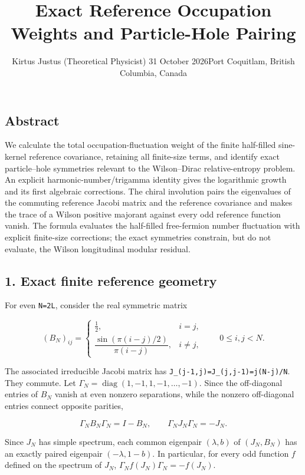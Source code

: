 \documentclass[
  10pt,
  a4paper,
]{article}
\title{Exact Reference Occupation Weights and Particle-Hole Pairing}
\author{Kirtus Justus (Theoretical Physicist) \textbullet{} 31 October 2026\tabularnewline Port Coquitlam, British Columbia, Canada}
\date{}
\begin{document}
\maketitle

\subsection{Abstract}\label{abstract}

We calculate the total occupation-fluctuation weight of the finite half-filled sine-kernel reference covariance, retaining all finite-size terms, and identify exact particle--hole symmetries relevant to the Wilson--Dirac relative-entropy problem. An explicit harmonic-number/trigamma identity gives the logarithmic growth and its first algebraic corrections. The chiral involution pairs the eigenvalues of the commuting reference Jacobi matrix and the reference covariance and makes the trace of a Wilson positive majorant against every odd reference function vanish. The formula evaluates the half-filled free-fermion number fluctuation with explicit finite-size corrections; the exact symmetries constrain, but do not evaluate, the Wilson longitudinal modular residual.

\subsection{1. Exact finite reference geometry}\label{exact-finite-reference-geometry}

For even \texttt{N=2L}, consider the real symmetric matrix

\[
(B_N)_{ij}=\begin{cases}\tfrac12,&i=j,\\
\dfrac{\sin(\pi(i-j)/2)}{\pi(i-j)},&i\ne j,
\end{cases}\qquad 0\le i,j<N.
\]

The associated irreducible Jacobi matrix has \texttt{J\_(j-1,j)=J\_(j,j-1)=j(N-j)/N}. They commute. Let \(\Gamma_N=\operatorname{diag}(1,-1,1,-1,\ldots,-1)\). Since the off-diagonal entries of \(B_N\) vanish at even nonzero separations, while the nonzero off-diagonal entries connect opposite parities,

\[
\boxed{\Gamma_N B_N\Gamma_N=I-B_N,\qquad\Gamma_N J_N\Gamma_N=-J_N.}\tag{1}
\]

Since \(J_N\) has simple spectrum, each common eigenpair \((\lambda,b)\) of \((J_N,B_N)\) has an exactly paired eigenpair \((-\lambda,1-b)\). In particular, for every odd function \(f\) defined on the spectrum of \(J_N\), \(\Gamma_N f(J_N)\Gamma_N=-f(J_N)\).
\end{document}
